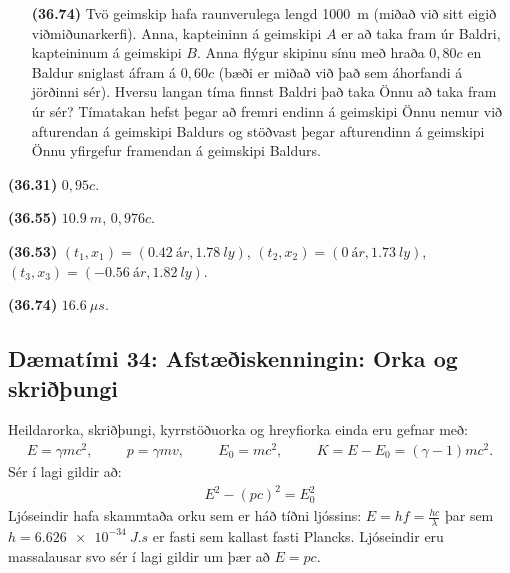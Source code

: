 \begin{enumerate}[label = \textbf{(\alph*)}]
\item[\textbf{(36.74)}] Tvö geimskip hafa raunverulega lengd \SI{1000}{m} (miðað við sitt eigið viðmiðunarkerfi). Anna, kapteininn á geimskipi $A$ er að taka fram úr Baldri, kapteininum á geimskipi $B$. Anna flýgur skipinu sínu með hraða $0,80c$ en Baldur sniglast áfram á $0,60c$ (bæði er miðað við það sem áhorfandi á jörðinni sér). Hversu langan tíma finnst Baldri það taka Önnu að taka fram úr sér? Tímatakan hefst þegar að fremri endinn á geimskipi Önnu nemur við afturendan á geimskipi Baldurs og stöðvast þegar afturendinn á geimskipi Önnu yfirgefur framendan á geimskipi Baldurs.

\end{enumerate}

\begin{tcolorbox}
\begin{enumerate*}[label = ]
  \item \textbf{(36.31)} $0,95c$.
  \item \textbf{(36.55)} $\SI{10.9}{m}$, $0,976c$.
  \item \textbf{(36.53)} $(t_1,x_1) = (\SI{0.42}{ár}, \SI{1.78}{ly})$,  $(t_2,x_2) = (\SI{0}{ár}, \SI{1.73}{ly})$, $(t_3,x_3) = (-\SI{0.56}{ár}, \SI{1.82}{ly})$.
  \item \textbf{(36.74)} $\SI{16.6}{\mu s}$.
\end{enumerate*}
\end{tcolorbox}

\newpage

\subsection*{Dæmatími 34: Afstæðiskenningin: Orka og skriðþungi}

\begin{tcolorbox}
Heildarorka, skriðþungi, kyrrstöðuorka og hreyfiorka einda eru gefnar með:
\begin{align*}
    E = \gamma mc^2, \hspace{1cm} p = \gamma mv, \hspace{1cm} E_0 = mc^2, \hspace{1cm} K = E-E_0 = (\gamma -1)mc^2.
\end{align*}
Sér í lagi gildir að:
\begin{align*}
    E^2 - (pc)^2 = E_0^2
\end{align*}
Ljóseindir hafa skammtaða orku sem er háð tíðni ljóssins: $E = hf = \frac{hc}{\lambda}$ þar sem $h = \SI{6.626e-34}{J.s}$ er fasti sem kallast fasti Plancks. Ljóseindir eru massalausar svo sér í lagi gildir um þær að $E = pc$.
\end{tcolorbox}

